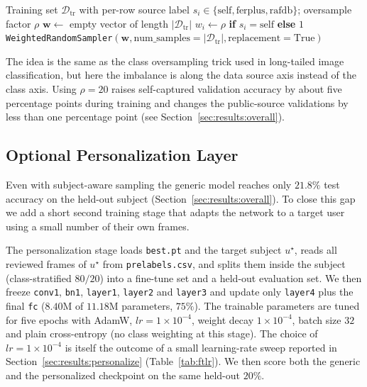 \documentclass[12pt,a4paper]{article}
\begin{document}
\begin{algorithm}[H]
\small
\caption{Subject-aware weighted random sampler}
\label{alg:sampler}
\begin{algorithmic}[1]
\Require Training set $\mathcal{D}_{\text{tr}}$ with per-row source
         label $s_i \in \{\text{self},\text{ferplus},\text{rafdb}\}$;
         oversample factor $\rho$
  \State $\mathbf{w} \gets$ empty vector of length $|\mathcal{D}_{\text{tr}}|$
    \State $w_i \gets \rho$ \textbf{if} $s_i = \text{self}$ \textbf{else} $1$
  \EndFor
  \State \Return \texttt{WeightedRandomSampler}$(\mathbf{w},
         \text{num\_samples}=|\mathcal{D}_{\text{tr}}|,
         \text{replacement}=\text{True})$
\EndFunction
\end{algorithmic}
\end{algorithm}

The idea is the same as the class oversampling trick used in
long-tailed image classification, but here the imbalance is
along the data source axis instead of the class axis. Using
$\rho=20$ raises self-captured validation accuracy by about
five percentage points during training and changes the
public-source validations by less than one percentage point
(see Section~\ref{sec:results:overall}).

\subsection{Optional Personalization Layer}
\label{sec:impl:personalize}

Even with subject-aware sampling the generic model reaches
only $21.8\%$ test accuracy on the held-out subject
(Section~\ref{sec:results:overall}). To close this gap we add
a short second training stage that adapts the network to a
target user using a small number of their own frames.

The personalization stage loads \texttt{best.pt} and the
target subject $u^\star$, reads all reviewed frames of
$u^\star$ from \texttt{prelabels.csv}, and splits them inside
the subject (class-stratified $80/20$) into a fine-tune set
and a held-out evaluation set. We then freeze \texttt{conv1},
\texttt{bn1}, \texttt{layer1}, \texttt{layer2} and
\texttt{layer3} and update only \texttt{layer4} plus the final
\texttt{fc} ($8.40$M of $11.18$M parameters, $75\%$). The
trainable parameters are tuned for five epochs with AdamW,
$lr=1\times 10^{-4}$, weight decay $1\times 10^{-4}$, batch
size $32$ and plain cross-entropy (no class weighting at this
stage). The choice of $lr=1\times 10^{-4}$ is itself the
outcome of a small learning-rate sweep reported in
Section~\ref{sec:results:personalize} (Table~\ref{tab:ftlr}). We then score both the generic and the personalized
checkpoint on the same held-out $20\%$.
\end{document}
